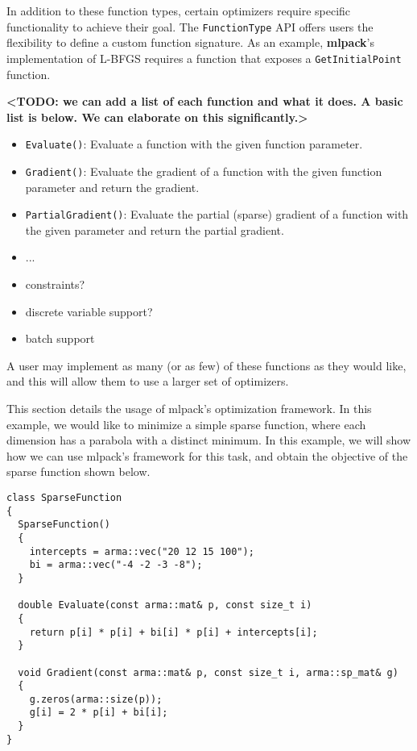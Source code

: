 \documentclass{article}
\begin{document}
In addition to these function types, certain optimizers require specific
functionality to achieve their goal. The {\tt FunctionType} API offers users the
flexibility to define a custom function signature. As an example, {\bf mlpack}'s
implementation of L-BFGS requires a function that exposes a
{\tt GetInitialPoint} function.


{\bf <TODO: we can add a list of each function and what it does.  A basic list
is below.  We can elaborate on this significantly.>}

\begin{itemize}
  \item {\tt Evaluate()}: Evaluate a function with the given function parameter.

  \item {\tt Gradient()}: Evaluate the gradient of a function with the given
      function parameter and return the gradient.

  \item {\tt PartialGradient()}: Evaluate the partial (sparse) gradient of a
      function with the given parameter and return the partial gradient.

  \item ...
  \item constraints?
  \item discrete variable support?
  \item batch support
\end{itemize}

A user may implement as many (or as few) of these functions as they would like,
and this will allow them to use a larger set of optimizers.

{\bf <TODO: add very simple example function>}


This section details the usage of mlpack's optimization framework. In this
example, we would like to minimize a simple sparse function, where each
dimension has a parabola with a distinct minimum. In this example, we will show
how we can use mlpack’s framework for this task, and obtain the objective of the
sparse function shown below.

\begin{verbatim}
class SparseFunction
{
  SparseFunction()
  {
    intercepts = arma::vec("20 12 15 100");
    bi = arma::vec("-4 -2 -3 -8");
  }

  double Evaluate(const arma::mat& p, const size_t i)
  {
    return p[i] * p[i] + bi[i] * p[i] + intercepts[i];
  }

  void Gradient(const arma::mat& p, const size_t i, arma::sp_mat& g)
  {
    g.zeros(arma::size(p));
    g[i] = 2 * p[i] + bi[i];
  }
}
\end{verbatim}
\end{document}
